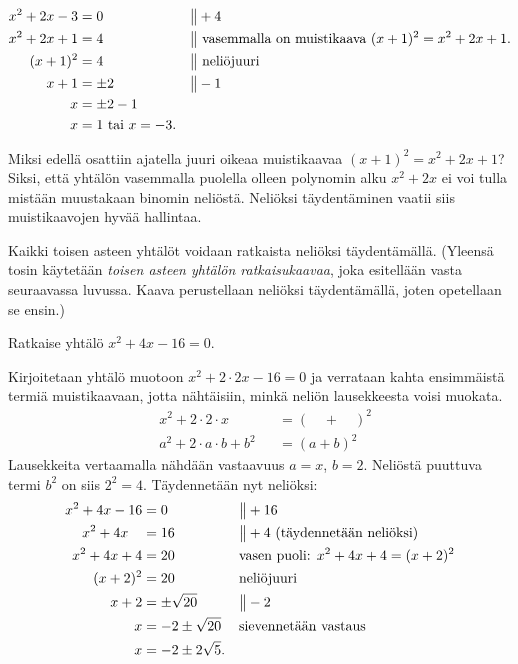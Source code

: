 \begin{align*}
x^2+2x-3 & = 0  &&\big\| +4 \\
x^2+2x+1 & = 4  &&\big\| \text{ vasemmalla on muistikaava } (x+1)^2=x^2+2x+1. \\
(x+1)^2 & = 4  &&\big\| \text{ neliöjuuri }  \\
x+1 & = \pm 2  &&\big\| -1 \\
x & = \pm 2 - 1 \\
x & = 1 \text{ tai } x= -3. 
\end{align*}

Miksi edellä osattiin ajatella juuri oikeaa muistikaavaa $(x+1)^2=x^2+2x+1$? Siksi, että yhtälön vasemmalla
puolella olleen polynomin alku $x^2+2x$ ei voi tulla mistään muustakaan binomin neliöstä.
Neliöksi täydentäminen vaatii siis muistikaavojen hyvää hallintaa.

Kaikki toisen asteen yhtälöt voidaan ratkaista neliöksi täydentämällä. (Yleensä tosin käytetään \emph{toisen asteen yhtälön ratkaisukaavaa}, joka esitellään vasta seuraavassa luvussa. Kaava perustellaan neliöksi täydentämällä, joten opetellaan se ensin.)

\begin{esimerkki} Ratkaise yhtälö $x^2+4x-16 = 0$. 

Kirjoitetaan yhtälö muotoon $x^2+2\cdot 2x-16 = 0$ ja verrataan kahta ensimmäistä termiä
muistikaavaan, jotta nähtäisiin, minkä neliön lausekkeesta voisi muokata.
\begin{align*}
&x^2+2\cdot 2\cdot x  &&= (\quad + \quad)^2\\
&a^2 +2\cdot a\cdot b +b^2 &&= (a+b)^2
\end{align*}
Lausekkeita vertaamalla nähdään vastaavuus $a = x$, $b= 2$. Neliöstä puuttuva
termi $b^2$ on siis $2^2=4$. Täydennetään nyt neliöksi:
\begin{align*}
x^2+4x-16 &= 0 &&\big\| + 16  \\
x^2+4x \quad  &= 16 &&\big\| + 4 \text{ (täydennetään neliöksi)}  \\
x^2+4x+4 &= 20 &&\text{vasen puoli: $ x^2+4x+4= (x+2)^2$} \\
(x+2)^2 &= 20 &&\text{neliöjuuri} \\
x+2 &= \pm \sqrt{20} &&\big\| - 2 \\
x &= -2 \pm \sqrt{20} &&\text{sievennetään vastaus} \\
x &= -2 \pm 2\sqrt{5}.
\end{align*}
\end{esimerkki}


